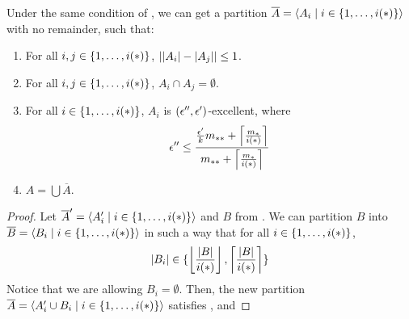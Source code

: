         \begin{lemma}[Claim 5.14.2] \label{lem:existance_of_excellent_partition_with_equal_size_and_no_remainder}
            Under the same condition of , we can get a
            partition $\overline{A} = \left< A_i \mid i \in \{ 1, \dots, i(*) \} \right>$ with no remainder, such that:
            \begin{enumerate}[label=(\alph*), ref=\alph*]
                \item \label{itm:existance_of_excellent_partition_with_equal_size_and_no_remainder.a}
                    For all $i, j \in \{ 1, \dots, i(*) \}$, $| | A_i |- | A_j | | \leq 1$.
                \item \label{itm:existance_of_excellent_partition_with_equal_size_and_no_remainder.b}
                    For all $i, j \in \{ 1, \dots, i(*) \}$, $A_i \cap A_j = \emptyset$.
                \item \label{itm:existance_of_excellent_partition_with_equal_size_and_no_remainder.c}
                    For all $i \in \{ 1, \dots, i(*) \}$, $A_i$ is $( \epsilon'', \epsilon' )$-excellent, where
                    \[
                        \epsilon'' \leq \frac{\frac{\epsilon'}{k} m_{**} + \left\lceil \frac{m_*}{i(*)} \right\rceil}{m_{**} + \left\lceil \frac{m_*}{i(*)} \right\rceil}
                    \]
                \item \label{itm:existance_of_excellent_partition_with_equal_size_and_no_remainder.d} $A = \bigcup \overline{A}$.
            \end{enumerate}
            \begin{proof}
                Let $\overline{A}' = \left< A_i' \mid i \in \{ 1, \dots, i(*) \} \right>$ and $B$ from
                .
                We can partition $B$ into $\overline{B} = \left< B_i \mid i \in \{ 1, \dots, i(*) \} \right>$ in such a way that
                for all $i \in \{ 1, \dots, i(*) \}$,
                \[
                    |B_i| \in \{ \left\lfloor \frac{| B |}{i(*)} \right\rfloor, \left\lceil \frac{| B |}{i(*)} \right\rceil \}
                \]
                Notice that we are allowing $B_i = \emptyset$.
                Then, the new partition $\overline{A} = \left< A_i' \cup B_i \mid i \in \{ 1, \dots, i(*) \} \right>$ satisfies
                ,
                 and

\end{proof}
\end{lemma}
